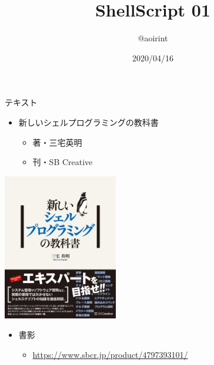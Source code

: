\documentclass[12pt,aspectratio=169]{beamer}
\title{ShellScript 01}
\author{@aoirint}
\date{2020/04/16}
\begin{document}
\frame{\maketitle}

\begin{frame}{テキスト}

  \begin{minipage}{0.58\textwidth}
    \begin{itemize}
      \item 新しいシェルプログラミングの教科書
      \begin{itemize}
        \item 著・三宅英明
        \item 刊・SB Creative
      \end{itemize}
    \end{itemize}
  \end{minipage}
  \hfill
  \begin{minipage}{0.38\textwidth}
    \vspace{-4\baselineskip}
    \begin{center}
      \includegraphics[width=5cm,bb=0 0 467 596]{./images/shellbook.jpg}
    \end{center}
  \end{minipage}

  \begin{itemize}
    \item 書影
    \begin{itemize}
      \item { \small \url{https://www.sbcr.jp/product/4797393101/} }
    \end{itemize}
  \end{itemize}

\end{frame}
\end{document}
